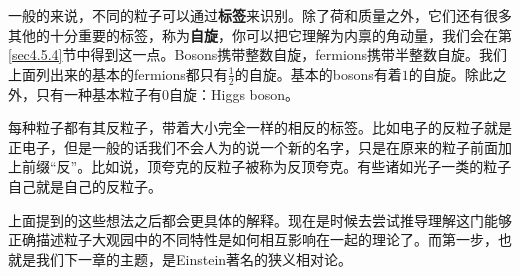 一般的来说，不同的粒子可以通过{\bf 标签}来识别。除了荷和质量之外，它们还有很多其他的十分重要的标签，称为{\bf 自旋}，你可以把它理解为内禀的角动量，我们会在第\ref{sec4.5.4}节中得到这一点。Bosons携带整数自旋，fermions携带半整数自旋。我们上面列出来的基本的fermions都只有$\tfrac{1}{2}$的自旋。基本的bosons有着$1$的自旋。除此之外，只有一种基本粒子有$0$自旋：Higgs boson。

每种粒子都有其反粒子，带着大小完全一样的相反的标签。比如电子的反粒子就是正电子，但是一般的话我们不会人为的说一个新的名字，只是在原来的粒子前面加上前缀``反''。比如说，顶夸克的反粒子被称为反顶夸克。有些诸如光子一类的粒子自己就是自己的反粒子。

上面提到的这些想法之后都会更具体的解释。现在是时候去尝试推导理解这门能够正确描述粒子大观园中的不同特性是如何相互影响在一起的理论了。而第一步，也就是我们下一章的主题，是Einstein著名的狭义相对论。




